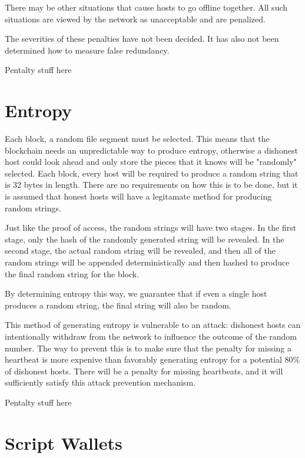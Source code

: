 \documentclass[twocolumn]{article}
\begin{document}
There may be other situations that cause hosts to go offline together.
All such situations are viewed by the network as unacceptable and are penalized.

The severities of these penalties have not been decided.
It has also not been determined how to measure false redundancy.

\begin{center}
Pentalty stuff here
\end{center}

\section{Entropy}

Each block, a random file segment must be selected.
This means that the blockchain needs an unpredictable way to produce entropy, otherwise a dishonest host could look ahead and only store the pieces that it knows will be "randomly" selected.
Each block, every host will be required to produce a random string that is 32 bytes in length.
There are no requirements on how this is to be done, but it is assumed that honest hosts will have a legitamate method for producing random strings.

Just like the proof of access, the random strings will have two stages.
In the first stage, only the hash of the randomly generated string will be revealed.
In the second stage, the actual random string will be revealed, and then all of the random strings will be appended deterministically and then hashed to produce the final random string for the block.

By determining entropy this way, we guarantee that if even a single host produces a random string, the final string will also be random.

This method of generating entropy is vulnerable to an attack: dishonest hosts can intentionally withdraw from the network to influence the outcome of the random number.
The way to prevent this is to make sure that the penalty for missing a heartbeat is more expenive than favorably generating entropy for a potential 80\% of dishonest hosts.
There will be a penalty for missing heartbeats, and it will sufficiently satisfy this attack prevention mechanism.

\begin{center}
Pentalty stuff here
\end{center}

\section{Script Wallets}
\end{document}
